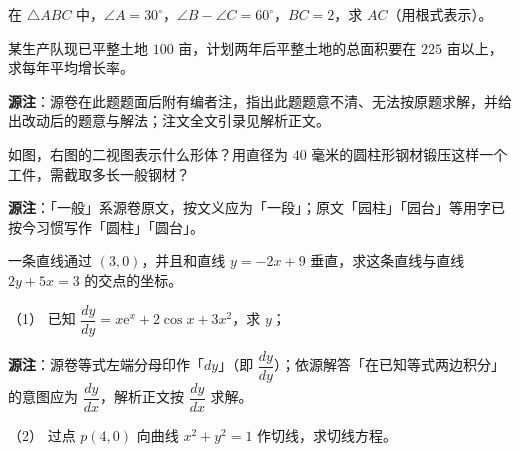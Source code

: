 \begin{question}
在 $\triangle ABC$ 中，$\angle A=30^\circ$，$\angle B-\angle C=60^\circ$，$BC=2$，求 $AC$（用根式表示）。
\nopagebreak[4]
\begin{center}\end{center}
\nopagebreak[4]
\end{question}
\begin{question}
某生产队现已平整土地 $100$ 亩，计划两年后平整土地的总面积要在 $225$ 亩以上，求每年平均增长率。

\begin{gktip}
\textbf{源注}：源卷在此题题面后附有编者注，指出此题题意不清、无法按原题求解，并给出改动后的题意与解法；注文全文引录见解析正文。
\end{gktip}

\Needspace{0.4\textheight}
\end{question}
\begin{question}
如图，右图的二视图表示什么形体？用直径为 $40$ 毫米的圆柱形钢材锻压这样一个工件，需截取多长一般钢材？

\begin{gktip}
\textbf{源注}：「一般」系源卷原文，按文义应为「一段」；原文「园柱」「园台」等用字已按今习惯写作「圆柱」「圆台」。
\end{gktip}
\nopagebreak[4]
\begin{center}\end{center}
\nopagebreak[4]
\end{question}
\begin{question}
一条直线通过 $(3,0)$，并且和直线 $y=-2x+9$ 垂直，求这条直线与直线 $2y+5x=3$ 的交点的坐标。

\end{question}
\begin{question}

（1） 已知 $\dfrac{dy}{dy}=x\mathrm{e}^{x}+2\cos x+3x^2$，求 $y$；

\begin{gktip}
\textbf{源注}：源卷等式左端分母印作「$dy$」（即 $\dfrac{dy}{dy}$）；依源解答「在已知等式两边积分」的意图应为 $\dfrac{dy}{dx}$，解析正文按 $\dfrac{dy}{dx}$ 求解。
\end{gktip}

（2） 过点 $p(4,0)$ 向曲线 $x^2+y^2=1$ 作切线，求切线方程。


\end{question}